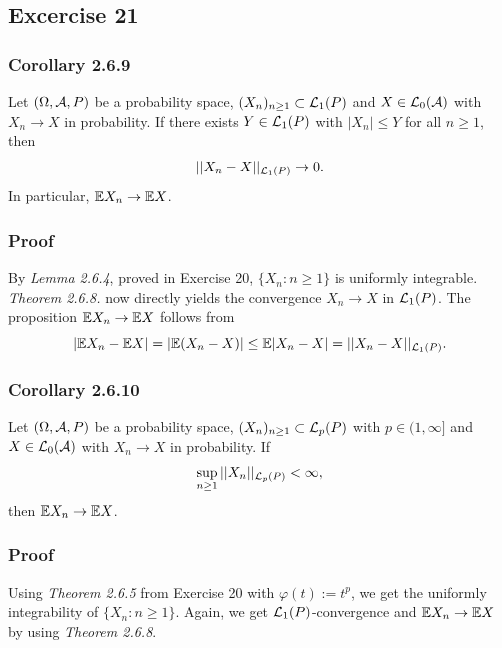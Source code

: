 \documentclass[12pt]{scrartcl}
\begin{document}
\subsection*{Excercise 21}
\subsubsection*{Corollary 2.6.9}

Let $(\Omega,\mathcal{A},P)$ be a probability space, $(X_n)_{n\ge 1}\subset\mathcal{L}_1(P)$ and $X\in\mathcal{L}_0(\mathcal{A})$ with $X_n\rightarrow X$ in probability. If there exists $Y\in\mathcal{L}_1(P)$ with $|X_n|\le Y$ for all $n\ge 1$, then
$$||X_n-X||_{\mathcal{L}_1(P)}\rightarrow 0.$$
In particular, $\mathbb{E} X_n\rightarrow\mathbb{E} X$.

\subsubsection*{Proof}
\einruecken

By \textit{Lemma 2.6.4}, proved in Exercise 20, $\{X_n:n\ge 1\}$ is uniformly integrable.
\textit{Theorem 2.6.8.} now directly yields the convergence $X_n\rightarrow X$ in $\mathcal{L}_1(P)$.
The proposition $\mathbb{E} X_n\rightarrow\mathbb{E} X$ follows from
$$|\mathbb{E} X_n-\mathbb{E} X|=|\mathbb{E}(X_n-X)|\le \mathbb{E}|X_n-X|=||X_n-X||_{\mathcal{L}_1(P)}.$$

\ausruecken

\subsubsection*{Corollary 2.6.10}

Let $(\Omega,\mathcal{A},P)$ be a probability space, $(X_n)_{n\ge 1}\subset\mathcal{L}_p(P)$ with $p\in(1,\infty]$ and $X\in\mathcal{L}_0(\mathcal{A})$ with $X_n\rightarrow X$ in probability. If
$$\sup_{n\ge 1}||X_n||_{\mathcal{L}_p(P)}<\infty,$$
then $\mathbb{E} X_n\rightarrow\mathbb{E} X$.

\subsubsection*{Proof}
\einruecken

Using \textit{Theorem 2.6.5} from Exercise 20 with $\varphi(t):=t^p$, we get the uniformly integrability of $\{X_n:n\ge 1\}$. Again, we get $\mathcal{L}_1(P)$-convergence and $\mathbb{E} X_n\rightarrow\mathbb{E} X$ by using \textit{Theorem 2.6.8}.

\ausruecken
	
\end{document}

